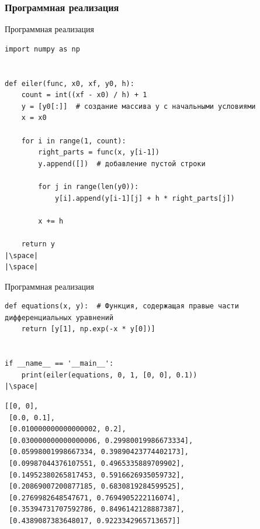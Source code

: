 \documentclass[aspectratio=169, mathserif]{beamer}	%
\begin{document}
\subsubsection{Программная реализация}
\begin{frame}[fragile, ]{Программная реализация}
\scriptsize
\begin{verbatim}
import numpy as np


def eiler(func, x0, xf, y0, h):
    count = int((xf - x0) / h) + 1
    y = [y0[:]]  # создание массива y с начальными условиями
    x = x0

    for i in range(1, count):
        right_parts = func(x, y[i-1])
        y.append([])  # добавление пустой строки

        for j in range(len(y0)):
            y[i].append(y[i-1][j] + h * right_parts[j])

        x += h

    return y
|\space|
|\space|
\end{verbatim}
\vfill
\end{frame}


\begin{frame}[fragile]{Программная реализация}
\scriptsize
\begin{verbatim}
def equations(x, y):  # Функция, содержащая правые части дифференциальных уравнений
    return [y[1], np.exp(-x * y[0])]


if __name__ == '__main__':
    print(eiler(equations, 0, 1, [0, 0], 0.1))
|\space|
\end{verbatim}
\vfill
\begin{verbatim}
[[0, 0],
 [0.0, 0.1],
 [0.010000000000000002, 0.2],
 [0.030000000000000006, 0.29980019986673334],
 [0.05998001998667334, 0.39890423774402173],
 [0.09987044376107551, 0.4965335889709902],
 [0.14952380265817453, 0.5916626935059732],
 [0.20869007200877185, 0.6830819284599525],
 [0.2769982648547671, 0.7694905222116074],
 [0.35394731707592786, 0.8496142128887387],
 [0.4389087383648017, 0.9223342965713657]]
\end{verbatim}
\vfill
\end{frame}
\end{document}
